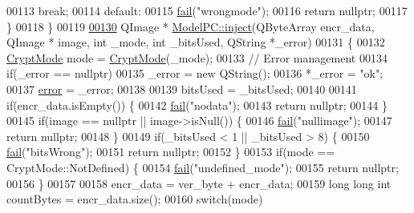 \begin{DoxyCode}
00113         \textcolor{keywordflow}{break};
00114         \textcolor{keywordflow}{default}:
00115             \hyperlink{class_model_p_c_a47464b59b7e37fcee25e55475708aabd}{fail}(\textcolor{stringliteral}{"wrongmode"});
00116             \textcolor{keywordflow}{return} \textcolor{keyword}{nullptr};
00117     \}
00118 \}
00119 
\hypertarget{modelpc_8cpp_source_l00130}{}\hyperlink{class_model_p_c_aada6a04d81ada8f2b4ba18108c8d6f10}{00130} QImage * \hyperlink{class_model_p_c_aada6a04d81ada8f2b4ba18108c8d6f10}{ModelPC::inject}(QByteArray encr\_data, QImage * image, \textcolor{keywordtype}{int} \_mode, \textcolor{keywordtype}{int} \_bitsUsed, 
      QString *\_error)
00131 \{
00132     \hyperlink{class_model_p_c_a296dd7afe3e1c49b3da25fd644fe4ceb}{CryptMode} mode = \hyperlink{class_model_p_c_a296dd7afe3e1c49b3da25fd644fe4ceb}{CryptMode}(\_mode);
00133     \textcolor{comment}{// Error management}
00134     \textcolor{keywordflow}{if}(\_error == \textcolor{keyword}{nullptr})
00135         \_error = \textcolor{keyword}{new} QString();
00136     *\_error = \textcolor{stringliteral}{"ok"};
00137     \hyperlink{class_model_p_c_a4e5a9c0ca1f06fe5bc478b6bf248c37c}{error} = \_error;
00138 
00139     bitsUsed = \_bitsUsed;
00140 
00141     \textcolor{keywordflow}{if}(encr\_data.isEmpty()) \{
00142         \hyperlink{class_model_p_c_a47464b59b7e37fcee25e55475708aabd}{fail}(\textcolor{stringliteral}{"nodata"});
00143         \textcolor{keywordflow}{return} \textcolor{keyword}{nullptr};
00144     \}
00145     \textcolor{keywordflow}{if}(image == \textcolor{keyword}{nullptr} || image->isNull()) \{
00146         \hyperlink{class_model_p_c_a47464b59b7e37fcee25e55475708aabd}{fail}(\textcolor{stringliteral}{"nullimage"});
00147         \textcolor{keywordflow}{return} \textcolor{keyword}{nullptr};
00148     \}
00149     \textcolor{keywordflow}{if}(\_bitsUsed < 1 || \_bitsUsed > 8) \{
00150         \hyperlink{class_model_p_c_a47464b59b7e37fcee25e55475708aabd}{fail}(\textcolor{stringliteral}{"bitsWrong"});
00151         \textcolor{keywordflow}{return} \textcolor{keyword}{nullptr};
00152     \}
00153     \textcolor{keywordflow}{if}(mode == CryptMode::NotDefined) \{
00154         \hyperlink{class_model_p_c_a47464b59b7e37fcee25e55475708aabd}{fail}(\textcolor{stringliteral}{"undefined\_mode"});
00155         \textcolor{keywordflow}{return} \textcolor{keyword}{nullptr};
00156     \}
00157 
00158     encr\_data = ver\_byte + encr\_data;
00159     \textcolor{keywordtype}{long} \textcolor{keywordtype}{long} \textcolor{keywordtype}{int} countBytes = encr\_data.size();
00160     \textcolor{keywordflow}{switch}(mode)

\end{DoxyCode}
